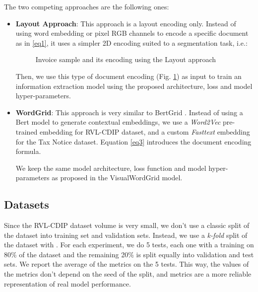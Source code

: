 \documentclass[runningheads]{llncs}
\begin{document}
The two competing approaches are the following ones:
\begin{itemize}
    \item \textbf{Layout Approach}: This approach is a layout encoding only. Instead of using word embedding or pixel RGB channels to encode a specific document as in \eqref{eq1}, it uses a simpler 2D encoding suited to a segmentation task, i.e.:
 

\begin{figure}[!h]
\begin{minipage}[t]{0.5\linewidth}
    \centering
    {\setlength{\fboxsep}{0pt}\setlength{\fboxrule}{1pt}}\label{f11}
\end{minipage}
\hspace{0.1cm}
\begin{minipage}[t]{0.5\linewidth} 
    \centering
     {\setlength{\fboxsep}{0pt}\setlength{\fboxrule}{1pt}}\label{f22}
\end{minipage}        
\caption{Invoice sample and its encoding using the Layout approach}
\label{fig:layout}
\end{figure}  


Then, we use this type of document encoding (Fig. \ref{fig:layout}) as input to train an information extraction model  using the proposed architecture, loss and model hyper-parameters. 

\item \textbf{WordGrid}: This approach is very similar to BertGrid \cite{bertgrid}. Instead of using a Bert \cite{bert} model to generate contextual embeddings, we use a \textit{Word2Vec} pre-trained embedding for RVL-CDIP dataset, and  a custom \textit{Fasttext} embedding for the Tax Notice dataset. Equation \eqref{eq3} introduces the document encoding formula. 

We keep the same model architecture, loss function and model hyper-parameters as  proposed in the VisualWordGrid model.





\end{itemize}
\subsection{Datasets}
Since the RVL-CDIP dataset volume is very small, we don't use a classic split of the dataset into training set and validation sets. Instead,  we use a \textit{k-fold} split of the dataset with . For each experiment, we do 5 tests, each one with a training on 80\% of the dataset and the remaining 20\% is split equally into validation and test sets. We report the average of the metrics on the 5 tests. This way, the values of the metrics don't depend on the seed of the split, and metrics are a more reliable representation of real model performance.  
\end{document}
